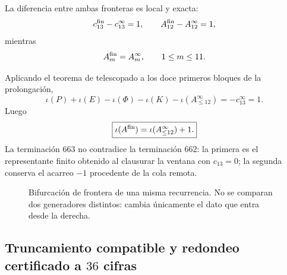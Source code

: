 La diferencia entre ambas fronteras es local y exacta:
\[
 c_{13}^{\rm fin}-c_{13}^{\infty}=1,
 \qquad
 A_{12}^{\rm fin}-A_{12}^{\infty}=1,
\]
mientras
\[
 A_m^{\rm fin}=A_m^\infty,
 \qquad 1\leq m\leq11.
\]

Aplicando el teorema de telescopado a los doce primeros bloques de la
prolongación,
\[
 \iota(P)+\iota(E)-\iota(\Phi)-\iota(K)
 -\iota(A^\infty_{\leq12})
 =-c_{13}^{\infty}=1.
\]
Luego
\begin{equation}
 \boxed{
 \iota(A^{\rm fin})
 =\iota(A^\infty_{\leq12})+1.}
 \label{p3-83-c25-s5:eq:relacion-unidad-fronteras-alpha}
\end{equation}
La terminación \(663\) no contradice la terminación \(662\): la primera
es el representante finito obtenido al clausurar la ventana con
\(c_{13}=0\); la segunda conserva el acarreo \(-1\) procedente de la cola
remota.

\begin{figure}[htbp]
\centering
{}
\caption{Bifurcación de frontera de una misma recurrencia. No se comparan
dos generadores distintos: cambia únicamente el dato que entra desde la
derecha.}
\label{p3-83-c25-s5:fig:bifurcacion-frontera-alpha}
\end{figure}

\subsection{Truncamiento compatible y redondeo certificado a \(36\) cifras}

